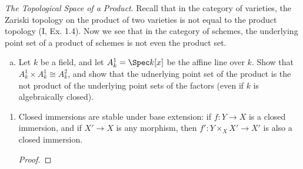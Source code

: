 \begin{exercise}%
	\textit{The Topological Space of a Product}. Recall that in the category of varieties, the Zariski topology on the product of two varieties is not equal to the product topology (I, Ex. 1.4). Now we see that in the category of schemes, the underlying point set of a product of schemes is not even the product set.
	\begin{enumerate}[(a)]
		\item Let $k $ be a field, and let $A^1_k = \Spec k[x] $ be the affine line over $k $. Show that $A^1_k \times A_k^1 \cong A_k^2$, and show that the udnerlying point set of the product is the not product of the underlying point sets of the factors (even if $k$ is algebraically closed).
	\end{enumerate}
\end{exercise}

\begin{exercise}
    \begin{enumerate}
        \item Closed immersions are stable under base extension: if $f: Y\to X$ is a closed immersion, and if $X'\to X$ is any morphism, then $f':Y\times_X X' \to X'$ is also a closed immersion.
        \begin{proof}
            
        \end{proof}
    \end{enumerate}
\end{exercise}

